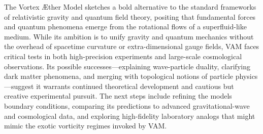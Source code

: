 The Vortex Æther Model sketches a bold alternative to the standard frameworks of relativistic gravity and quantum field theory, positing that fundamental forces and quantum phenomena emerge from the rotational flows of a superfluid-like medium. While its ambition is to unify gravity and quantum mechanics without the overhead of spacetime curvature or extra-dimensional gauge fields, VAM faces critical tests in both high-precision experiments and large-scale cosmological observations. Its possible successes—explaining wave-particle duality, clarifying dark matter phenomena, and merging with topological notions of particle physics—suggest it warrants continued theoretical development and cautious but creative experimental pursuit. The next steps include refining the model\rqs s boundary conditions, comparing its predictions to advanced gravitational-wave and cosmological data, and exploring high-fidelity laboratory analogs that might mimic the exotic vorticity regimes invoked by VAM.
